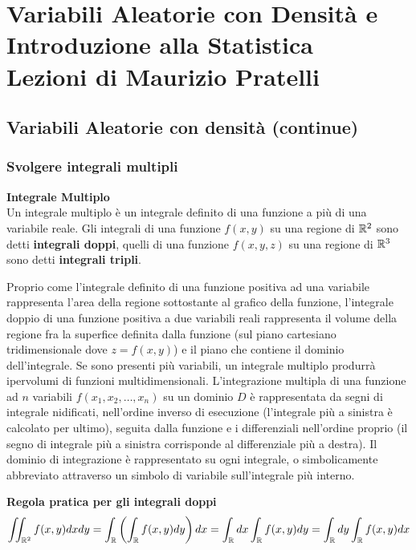\part{Variabili Aleatorie con Densità e Introduzione alla Statistica \\ Lezioni di Maurizio Pratelli}

\chapter{Variabili Aleatorie con densità (continue)}

\section{Svolgere integrali multipli}
\begin{defn}
    \textbf{Integrale Multiplo} \\
    Un integrale multiplo è un integrale definito di una funzione a più di una
    variabile reale. Gli integrali di una funzione $f(x,y)$ su una regione di $
    \mathbb{R}^2 $ sono detti \textbf{integrali doppi}, quelli di una funzione
    $f(x,y,z)$ su una regione di $ \mathbb{R}^3 $ sono detti \textbf{integrali tripli}.

    Proprio come l'integrale definito di una funzione positiva ad una variabile
    rappresenta l'area della regione sottostante al grafico della funzione,
    l'integrale doppio di una funzione positiva a due variabili reali
    rappresenta il volume della regione fra la superfice definita dalla funzione
    (sul piano cartesiano tridimensionale dove $ z = f(x, y)$) e il piano che
    contiene il dominio dell'integrale. Se sono presenti più variabili, un
    integrale multiplo produrrà ipervolumi di funzioni multidimensionali.
    L'integrazione multipla di una funzione ad $n$ variabili $f(x_1, x_2,
    \hdots, x_n)$ su un dominio $D$ è rappresentata da segni di integrale
    nidificati, nell'ordine inverso di esecuzione (l'integrale più a sinistra è
    calcolato per ultimo), seguita dalla funzione e i differenziali nell'ordine
    proprio (il segno di integrale più a sinistra corrisponde al differenziale
    più a destra). Il dominio di integrazione è rappresentato su ogni integrale,
    o simbolicamente abbreviato attraverso un simbolo di variabile
    sull'integrale più interno.
\end{defn}


\begin{defn}
    \textbf{Regola pratica per gli integrali doppi} \\
    \begin{equation*}
        \iint_{\mathbb{R}^2} f(x,y) dx dy = \int_{\mathbb{R}} \left( \int_{\mathbb{R}} f(x,y) dy \right) dx = \int_{\mathbb{R}} dx \int_{\mathbb{R}} f(x,y) dy \\
        = \int_{\mathbb{R}} dy \int_{\mathbb{R}} f(x,y) dx
    \end{equation*}
\end{defn}

